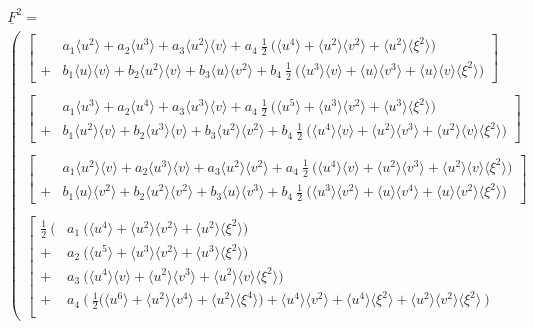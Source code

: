 \documentclass[
	pdftex,             %
	12pt,				%
	a4paper,		   	%
	english,				%
	oneside,			%
]{article}
\newcommand{\mom}[1]{\langle #1 \rangle}
\newcommand{\uu}[1]{\underline{#1}}
\begin{document}
\begin{math}
\begin{array}{l}
\uu{F}^2 
=
\\
\left(
\begin{array}{l}
\left[
\begin{array}{ll}
  & a_1 \mom{u^2} + 
    a_2 \mom{u^3} +
    a_3 \mom{u^2}\mom{v} +
    a_4 ~\tfrac{1}{2}~\big( \mom{u^4} + \mom{u^2}\mom{v^2} + \mom{u^2}\mom{\xi^2} \big)
\\	
+ & b_1 \mom{u}\mom{v} +
b_2 \mom{u^2}\mom{v} +
b_3 \mom{u}\mom{v^2} +
b_4 ~\tfrac{1}{2}~\big( \mom{u^3}\mom{v} + \mom{u}\mom{v^3} + \mom{u}\mom{v}\mom{\xi^2} \big)
\end{array}
\right]
\\ ~\\
\left[
\begin{array}{ll}
&
a_1 \mom{u^3} +
a_2 \mom{u^4} +
a_3 \mom{u^3}\mom{v} +
a_4 ~\tfrac{1}{2}~\big( \mom{u^5} + \mom{u^3}\mom{v^2} + \mom{u^3}\mom{\xi^2} \big)
\\	
+&
b_1 \mom{u^2}\mom{v} +
b_2 \mom{u^3}\mom{v}+
b_3 \mom{u^2}\mom{v^2}+
b_4 ~\tfrac{1}{2}~\big( \mom{u^4}\mom{v} + \mom{u^2}\mom{v^3} + \mom{u^2}\mom{v}\mom{\xi^2} \big)
\end{array}
\right]
\\ ~ \\
\left[
\begin{array}{ll}
&
a_1 \mom{u^2}\mom{v} +
a_2 \mom{u^3}\mom{v} +
a_3 \mom{u^2}\mom{v^2} +
a_4 ~\tfrac{1}{2}~\big( \mom{u^4}\mom{v} + \mom{u^2}\mom{v^3} + \mom{u^2}\mom{v}\mom{\xi^2} \big)
\\	
+ &
b_1 \mom{u}\mom{v^2} +
b_2 \mom{u^2}\mom{v^2}+
b_3 \mom{u}\mom{v^3}+
b_4 ~\tfrac{1}{2}~\big( \mom{u^3}\mom{v^2} + \mom{u}\mom{v^4} + \mom{u}\mom{v^2}\mom{\xi^2} \big)
\end{array}
\right]
\\ ~ \\
\left[
\begin{array}{ll}
\frac{1}{2} ~ \Big( 
   & a_1~ \big( \mom{u^4} + \mom{u^2}\mom{v^2} + \mom{u^2}\mom{\xi^2} \big) \\
 + & a_2~ \big( \mom{u^5} + \mom{u^3}\mom{v^2} + \mom{u^3}\mom{\xi^2} \big) \\
 + & a_3~ \big( \mom{u^4}\mom{v} + \mom{u^2}\mom{v^3} + \mom{u^2}\mom{v}\mom{\xi^2} \big) \\
 + & a_4~ \big(~ \tfrac{1}{2} \big( \mom{u^6} + \mom{u^2}\mom{v^4} + \mom{u^2}\mom{\xi^4} \big)
 				+ \mom{u^4}\mom{v^2} + \mom{u^4}\mom{\xi^2} + \mom{u^2}\mom{v^2}\mom{\xi^2} ~\big) \\

\end{array}
\end{array}
\end{array}
\end{math}
\end{document}

